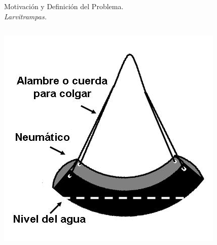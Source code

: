 
\begin{frame}[t]{Motivación y Definición del Problema.\\\textit{Larvitrampas.}}
  \begin{center}
    \begin{columns}[c]
        \begin{column}[c]{3cm}
          \includegraphics[width=\textwidth]{../book/anexos/graphics/disenho-1.png}


\end{column}
\end{columns}
\end{center}
\end{frame}
